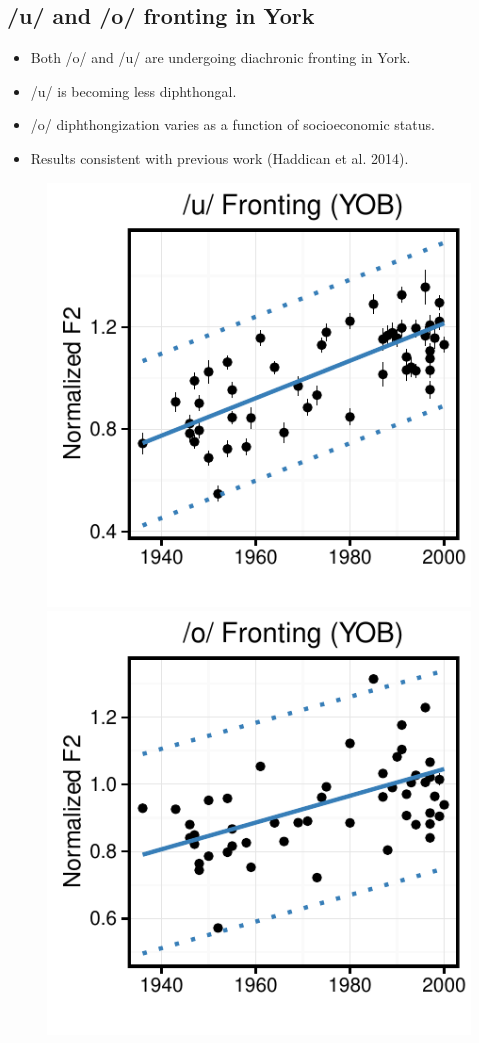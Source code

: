 \documentclass[a0,portrait]{a0poster}
\begin{document}
\begin{multicols}{4}
\section*{/u/ and /o/ fronting in York}
\normalsize
\begin{itemize}
\item{Both /o/ and /u/ are undergoing diachronic fronting in York.}
\item{/u/ is becoming less diphthongal.}
\item{/o/ diphthongization varies as a function of socioeconomic status.}
\item{Results consistent with previous work (Haddican et al. 2014).}
\end{itemize}
\begin{figure}[H]
\centering
\includegraphics[scale=1.65]{u_fronting_yob.pdf}\includegraphics[scale=1.65]{o_fronting_yob.pdf} 

\end{figure}
\end{multicols}
\end{document}
